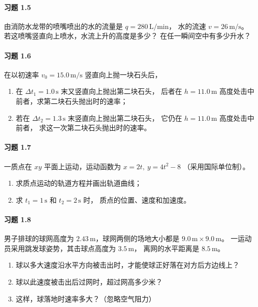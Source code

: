 \paragraph{习题 1.5}
由消防水龙带的喷嘴喷出的水的流量是 \(q=280\,\mathrm{L/min}\)，
水的流速 \(v=26\,\mathrm{m/s}\)。
若这喷嘴竖直向上喷水，水流上升的高度是多少？
在任一瞬间空中有多少升水？

\paragraph{习题 1.6}
在以初速率 \(v_0=15.0\,\mathrm{m/s}\) 竖直向上抛一块石头后，
\begin{enumerate}
\item 在 \(\Delta t_1=1.0\,\mathrm{s}\) 末又竖直向上抛出第二块石头，
后者在 \(h=11.0\,\mathrm{m}\) 高度处击中前者，求第二块石头抛出时的速率；
\item 若在 \(\Delta t_2=1.3\,\mathrm{s}\) 末竖直向上抛出第二块石头，
它仍在 \(h=11.0\,\mathrm{m}\) 高度处击中前者，
求这一次第二块石头抛出时的速率。
\end{enumerate}

\paragraph{习题 1.7}
一质点在 \(xy\) 平面上运动，运动函数为 \(x=2t,\ y=4t^2-8\)
（采用国际单位制）。
\begin{enumerate}
\item 求质点运动的轨道方程并画出轨道曲线；
\item 求 \(t_1=1\,\mathrm{s}\) 和 \(t_2=2\,\mathrm{s}\) 时，
质点的位置、速度和加速度。
\end{enumerate}

\paragraph{习题 1.8}
男子排球的球网高度为 \(2.43\,\mathrm{m}\)，球网两侧的场地大小都是
\(9.0\,\mathrm{m}\times9.0\,\mathrm{m}\)。
一运动员采用跳发球姿势，其击球点高度为 \(3.5\,\mathrm{m}\)，
离网的水平距离是 \(8.5\,\mathrm{m}\)。
\begin{enumerate}
\item 球以多大速度沿水平方向被击出时，才能使球正好落在对方后方边线上？
\item 球以此速度被击出后过网时，超过网高多少米？
\item 这样，球落地时速率多大？（忽略空气阻力）
\end{enumerate}

